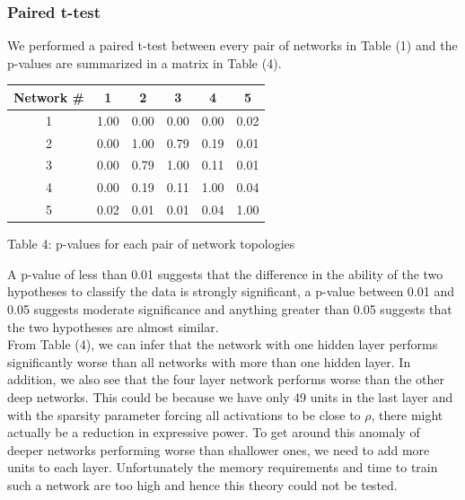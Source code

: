 \documentclass[10pt,twocolumn,letterpaper]{article}
\begin{document}
\subsubsection{Paired t-test}
We performed a paired t-test between every pair of networks in Table (1) and the p-values are summarized in a matrix in Table (4). 
\begin{center}
\begin{tabular}{|c|c|c|c|c|c|}
	\hline
	\textbf{Network \#} & \textbf{1} & \textbf{2} & \textbf{3} & \textbf{4} & \textbf{5} \\ \hline \hline
	1 & 1.00 & 0.00 & 0.00 & 0.00 & 0.02\\ \hline
	2 & 0.00 & 1.00 & 0.79 & 0.19 & 0.01\\ \hline
	3 & 0.00 & 0.79 & 1.00 & 0.11 & 0.01\\ \hline
	4 & 0.00 & 0.19 & 0.11 & 1.00 & 0.04\\ \hline
	5 & 0.02 & 0.01 & 0.01 & 0.04 & 1.00\\ \hline
\end{tabular}
\end{center}
\begin{center}
	Table 4: p-values for each pair of network topologies
\end{center}
A p-value of less than 0.01 suggests that the difference in the ability of the two hypotheses to classify the data is strongly significant, a p-value between 0.01 and 0.05 suggests moderate significance and anything greater than 0.05 suggests that the two hypotheses are almost similar.\\

From Table (4), we can infer that the network with one hidden layer performs significantly worse than all networks with more than one hidden layer. In addition, we also see that the four layer network performs worse than the other deep networks. This could be because we have only 49 units in the last layer and with the sparsity parameter forcing all activations to be close to $\rho$, there might actually be a reduction in expressive power. To get around this anomaly of deeper networks performing worse than shallower ones, we need to add more units to each layer. Unfortunately the memory requirements and time to train such a network are too high and hence this theory could not be tested.
\end{document}
